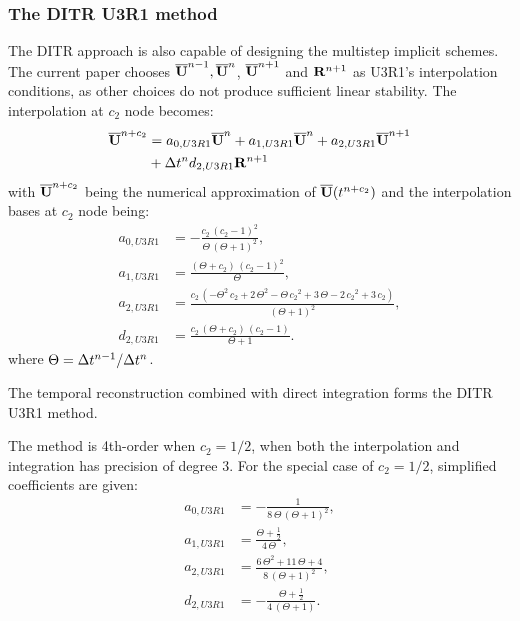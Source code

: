 \subsubsection{The DITR U3R1 method}

The DITR approach is also
capable of designing the multistep implicit schemes.
The current paper chooses $\overline{\mathbf{U}}^{n-1},\overline{\mathbf{U}}^{n}$, $\overline{\mathbf{U}}^{n+1}$
and $\mathbf{R}^{n+1}$ as U3R1's interpolation conditions,
as other choices do not produce sufficient linear stability.
The interpolation at $c_2$ node becomes:
\begin{equation}
    \begin{aligned}
        \label{eq:TRU3R1}
        \overline{\mathbf{U}}^{n+c_2} & =
        a_{0,U3R1}\overline{\mathbf{U}}^{n} +
        a_{1,U3R1}\overline{\mathbf{U}}^{n} +
        a_{2,U3R1}\overline{\mathbf{U}}^{n + 1}
        \\ & +
        {\Delta} t^n d_{2,U3R1}\mathbf{R}^{n + 1}
    \end{aligned}
\end{equation}
with $\overline{\mathbf{U}}^{n+c_2}$ being
the numerical approximation
of $\overline{\mathbf{U}}(t^{n+c_2})$
and the interpolation bases at $c_2$ node being:
\begin{equation}
    \begin{aligned}
        a_{0,U3R1} & = -\frac{c_{2}\,{\left(c_{2}-1\right)}^2}{\Theta\,{\left(\Theta+1\right)}^2}       ,                                                      \\
        a_{1,U3R1} & = \frac{\left(\Theta+c_{2}\right)\,{\left(c_{2}-1\right)}^2}{\Theta}                     ,                                                \\
        a_{2,U3R1} & =  \frac{c_{2}\,\left(-\Theta^2\,c_{2}+2\,\Theta^2-\Theta\,{c_{2}}^2+3\,\Theta-2\,{c_{2}}^2+3\,c_{2}\right)}{{\left(\Theta+1\right)}^2} , \\
        d_{2,U3R1} & =   \frac{c_{2}\,\left(\Theta+c_{2}\right)\,\left(c_{2}-1\right)}{\Theta+1}.
    \end{aligned}
    \label{eq:interpU3R1}
\end{equation}
where $\Theta = {\Delta} t^{n-1}/{\Delta} t^{n}$.

The temporal reconstruction 
combined with direct integration 
forms the DITR U3R1 method.

The method is 4th-order when $c_2=1/2$, when
both the interpolation and integration has precision
of degree 3.
For the special case of $c_2=1/2$, simplified
coefficients are given:
\begin{equation}
    \begin{aligned}
        a_{0,U3R1} & = -\frac{1}{8\,\Theta\,{\left(\Theta+1\right)}^2}  ,              \\
        a_{1,U3R1} & = \frac{\Theta+\frac{1}{2}}{4\,\Theta}        ,                   \\
        a_{2,U3R1} & =  \frac{6\,\Theta^2+11\,\Theta+4}{8\,{\left(\Theta+1\right)}^2}, \\
        d_{2,U3R1} & = -\frac{\Theta+\frac{1}{2}}{4\,\left(\Theta+1\right)}.
    \end{aligned}
    \label{eq:interpU3R1-S}
\end{equation}


